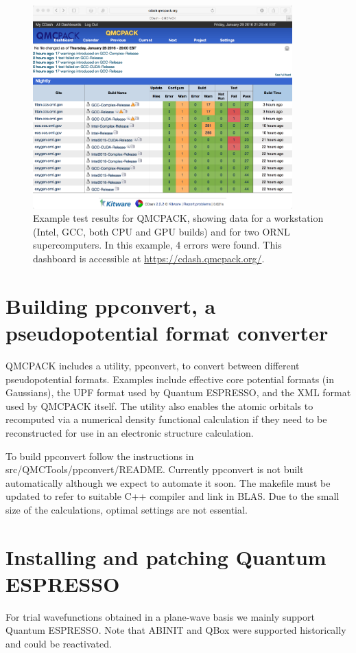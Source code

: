 \begin{figure}
  \centering
  \includegraphics[width=10cm]{figures/QMCPACK_CDash_CTest_Results_20160129.png}
  \caption{Example test results for QMCPACK, showing data for a
    workstation (Intel, GCC, both CPU and GPU builds) and for two ORNL
    supercomputers. In this example, 4 errors were found. This
    dashboard is accessible at \url{https://cdash.qmcpack.org/}.}
  \label{fig:cdash}
\end{figure}

\section{Building ppconvert, a pseudopotential format converter}
\label{sec:buildppconvert}
QMCPACK includes a utility, ppconvert, to convert between different
pseudopotential formats. Examples include effective core potential
formats (in Gaussians), the UPF format used by Quantum ESPRESSO, and
the XML format used by QMCPACK itself. The utility also enables the
atomic orbitals to recomputed via a numerical density functional
calculation if they need to be reconstructed for use in an
electronic structure calculation.

To build ppconvert follow the instructions in
src/QMCTools/ppconvert/README. Currently ppconvert is not built
automatically although we expect to automate it soon. The makefile
must be updated to refer to suitable C++ compiler and link in
BLAS. Due to the small size of the calculations, optimal settings are
not essential.

\section{Installing and patching Quantum ESPRESSO}
\label{sec:buildqe}
For trial wavefunctions obtained in a plane-wave basis we mainly
support Quantum ESPRESSO. Note that ABINIT and QBox were supported historically
and could be reactivated.

